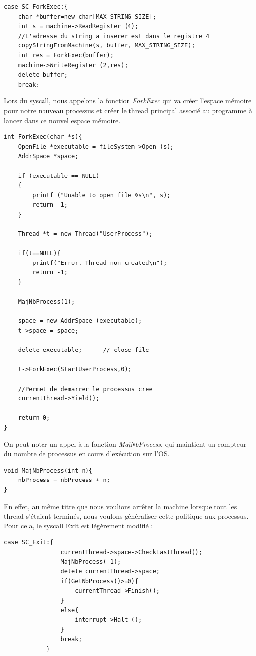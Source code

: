 \documentclass[a4paper,10pt]{article}
\begin{document}
\begin{lstlisting}[frame=single]
case SC_ForkExec:{
	char *buffer=new char[MAX_STRING_SIZE];
	int s = machine->ReadRegister (4);
	//L'adresse du string a inserer est dans le registre 4
	copyStringFromMachine(s, buffer, MAX_STRING_SIZE);
	int res = ForkExec(buffer);
	machine->WriteRegister (2,res);
	delete buffer;
	break;
\end{lstlisting}

Lors du syscall, nous appelons la fonction \textit{ForkExec} qui va créer l'espace mémoire pour notre nouveau processus et créer le thread principal associé au programme à lancer
dans ce nouvel espace mémoire.

\begin{lstlisting}[frame=single]
 int ForkExec(char *s){
	OpenFile *executable = fileSystem->Open (s);
	AddrSpace *space;

	if (executable == NULL)
	{
		printf ("Unable to open file %s\n", s);
		return -1;
	}

	Thread *t = new Thread("UserProcess");

	if(t==NULL){
		printf("Error: Thread non created\n");
		return -1;
	}

	MajNbProcess(1);
	
	space = new AddrSpace (executable);
	t->space = space;

	delete executable;		// close file

	t->ForkExec(StartUserProcess,0);

	//Permet de demarrer le processus cree
	currentThread->Yield();

	return 0;
}
\end{lstlisting}

On peut noter un appel à la fonction \textit{MajNbProcess}, qui maintient un compteur du nombre de processus en cours d'exécution sur l'OS.
\begin{lstlisting}[frame=single]
 void MajNbProcess(int n){
	nbProcess = nbProcess + n;
}
\end{lstlisting}
\newpage
En effet, au même titre que nous voulions arrêter la machine lorsque tout les thread s'étaient terminés, nous voulons généraliser cette politique aux processus.
Pour cela, le syscall Exit est légèrement modifié :

\begin{lstlisting}[frame=single]
 			case SC_Exit:{
				currentThread->space->CheckLastThread();
				MajNbProcess(-1);
				delete currentThread->space;
				if(GetNbProcess()>=0){
					currentThread->Finish();
				}
				else{
					interrupt->Halt ();
				}
				break;
			}
\end{lstlisting}
\end{document}
